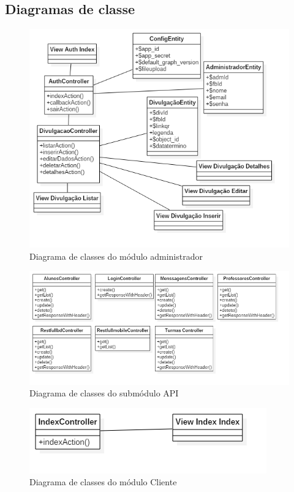 \subsection{Diagramas de classe}
\begin{figure}[H]
    \centering
    \includegraphics[width=\textwidth]{figuras/diagramaclasseADM}
    \caption{Diagrama de classes do módulo administrador}
\end{figure}

\begin{figure}[H]
    \centering
    \includegraphics[width=\textwidth]{figuras/diagramaclasseAPI}
    \caption{Diagrama de classes do submódulo API}
\end{figure}

\begin{figure}[H]
    \centering
    \includegraphics[width=\textwidth]{figuras/diagramaclasseCLIENTE}
    \caption{Diagrama de classes do módulo Cliente}
\end{figure}

